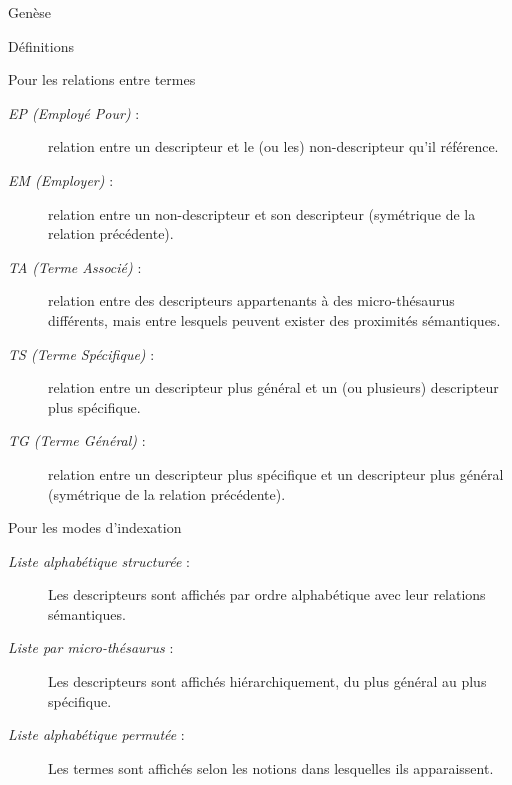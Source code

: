 \documentclass[a4paper, 12pt]{report}
\begin{document}
\begin{chapter}{Genèse}
\begin{section}{Définitions}
		\begin{subsection}{Pour les relations entre termes}
			\label{glouglou}
			\begin{description}
				\item[\emph{EP (Employé Pour)} :] relation entre un descripteur et le (ou les) non-descripteur qu'il référence.
				\item[\emph{EM (Employer)} :] relation entre un non-descripteur et son descripteur (symétrique de la relation précédente).
				\item[\emph{TA (Terme Associé)} :] relation entre des descripteurs appartenants à des micro-thésaurus différents, mais entre lesquels peuvent exister des
				proximités sémantiques.
				\item[\emph{TS (Terme Spécifique)} :] relation entre un descripteur plus général et un (ou plusieurs) descripteur plus spécifique.
				\item[\emph{TG (Terme Général)} :] relation entre un descripteur plus spécifique et un descripteur plus général (symétrique de la relation précédente).
			\end{description}
		\end{subsection}
		
		\begin{subsection}{Pour les modes d'indexation}
			\begin{description}
				\item[\emph{Liste alphabétique structurée} :] Les descripteurs sont affichés par ordre alphabétique avec leur relations sémantiques.
				\item[\emph{Liste par micro-thésaurus} :] Les descripteurs sont affichés hiérarchiquement, du plus général au plus spécifique.
				\item[\emph{Liste alphabétique permutée} :] Les termes sont affichés selon les notions dans lesquelles ils apparaissent.
			\end{description}
		\end{subsection}
	\end{section}
\end{chapter}
\end{document}
